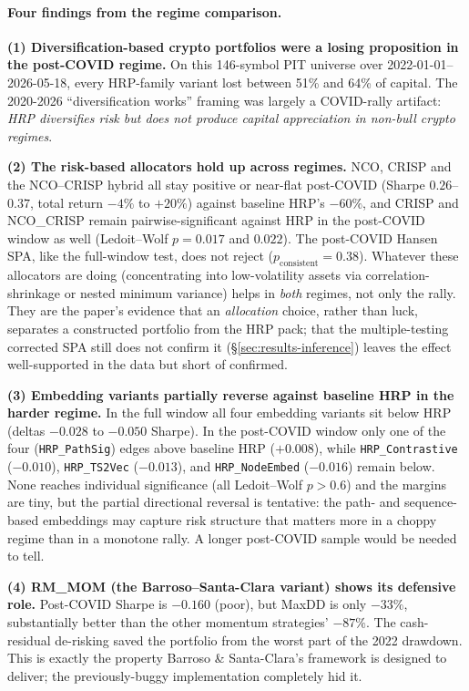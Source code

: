 \documentclass[11pt,a4paper]{article}
\begin{document}
\paragraph{Four findings from the regime comparison.}

\textbf{(1) Diversification-based crypto portfolios were a losing
proposition in the post-COVID regime.} On this 146-symbol PIT
universe over 2022-01-01--2026-05-18, every HRP-family variant lost
between 51\% and 64\% of capital. The 2020-2026 ``diversification
works'' framing was largely a COVID-rally artifact:
\emph{HRP diversifies risk but does not produce capital appreciation
in non-bull crypto regimes}.

\textbf{(2) The risk-based allocators hold up across regimes.} NCO,
CRISP and the NCO--CRISP hybrid all stay positive or near-flat
post-COVID (Sharpe $0.26$--$0.37$, total return $-4\%$ to $+20\%$)
against baseline HRP's $-60\%$, and CRISP and NCO\_CRISP remain
pairwise-significant against HRP in the post-COVID window as well
(Ledoit--Wolf $p=0.017$ and $0.022$). The post-COVID Hansen SPA, like
the full-window test, does not reject ($p_{\text{consistent}}=0.38$).
Whatever these allocators are
doing (concentrating into low-volatility assets via
correlation-shrinkage or nested minimum variance) helps in
\emph{both} regimes, not only the rally. They are the paper's evidence
that an \emph{allocation} choice, rather than luck, separates a
constructed portfolio from the HRP pack; that the multiple-testing
corrected SPA still does not confirm it (\S\ref{sec:results-inference})
leaves the effect well-supported in the data but short of confirmed.

\textbf{(3) Embedding variants partially reverse against baseline HRP
in the harder regime.} In the full window all four embedding variants
sit below HRP (deltas $-0.028$ to $-0.050$ Sharpe). In the
post-COVID window only one of the four (\texttt{HRP\_PathSig}) edges
above baseline HRP ($+0.008$), while \texttt{HRP\_Contrastive}
($-0.010$), \texttt{HRP\_TS2Vec} ($-0.013$), and
\texttt{HRP\_NodeEmbed} ($-0.016$) remain below. None reaches individual significance (all
Ledoit--Wolf $p>0.6$) and the margins are tiny, but the partial
directional reversal is tentative: the path- and sequence-based
embeddings may capture risk structure that matters more in a choppy
regime than in a monotone rally. A longer post-COVID sample would be
needed to tell.

\textbf{(4) RM\_MOM (the Barroso--Santa-Clara variant)
shows its defensive role.} Post-COVID Sharpe is $-0.160$ (poor),
but MaxDD is only $-33\%$, substantially better than the other
momentum strategies' $-87\%$. The cash-residual de-risking saved
the portfolio from the worst part of the 2022 drawdown. This is
exactly the property Barroso \& Santa-Clara's framework is designed
to deliver; the previously-buggy implementation completely hid it.
\end{document}
